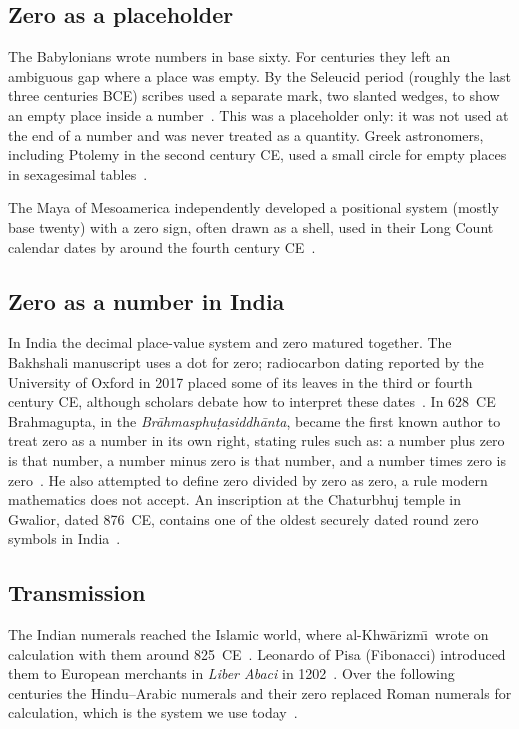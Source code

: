 \documentclass[11pt,a4paper]{article}
\theoremstyle{definition}
\begin{document}
\subsection{Zero as a placeholder}
The Babylonians wrote numbers in base sixty. For centuries they left an ambiguous gap where a place was empty. By the Seleucid period (roughly the last three centuries BCE) scribes used a separate mark, two slanted wedges, to show an empty place inside a number~\cite{neugebauer,ifrah}. This was a placeholder only: it was not used at the end of a number and was never treated as a quantity. Greek astronomers, including Ptolemy in the second century CE, used a small circle for empty places in sexagesimal tables~\cite{neugebauer}.

The Maya of Mesoamerica independently developed a positional system (mostly base twenty) with a zero sign, often drawn as a shell, used in their Long Count calendar dates by around the fourth century CE~\cite{kaplan,chrisomalis,joseph}.

\subsection{Zero as a number in India}
In India the decimal place-value system and zero matured together. The Bakhshali manuscript uses a dot for zero; radiocarbon dating reported by the University of Oxford in 2017 placed some of its leaves in the third or fourth century CE, although scholars debate how to interpret these dates~\cite{bodleian,plofker}. In 628~CE Brahmagupta, in the \emph{Br\=ahmasphu\d{t}asiddh\=anta}, became the first known author to treat zero as a number in its own right, stating rules such as: a number plus zero is that number, a number minus zero is that number, and a number times zero is zero~\cite{colebrooke,plofker}. He also attempted to define zero divided by zero as zero, a rule modern mathematics does not accept. An inscription at the Chaturbhuj temple in Gwalior, dated 876~CE, contains one of the oldest securely dated round zero symbols in India~\cite{kaplan,plofker}.

\subsection{Transmission}
The Indian numerals reached the Islamic world, where al-Khw\=arizm\=\i\ wrote on calculation with them around 825~CE~\cite{ifrah}. Leonardo of Pisa (Fibonacci) introduced them to European merchants in \emph{Liber Abaci} in 1202~\cite{sigler}. Over the following centuries the Hindu--Arabic numerals and their zero replaced Roman numerals for calculation, which is the system we use today~\cite{kaplan,seife}.
\end{document}
